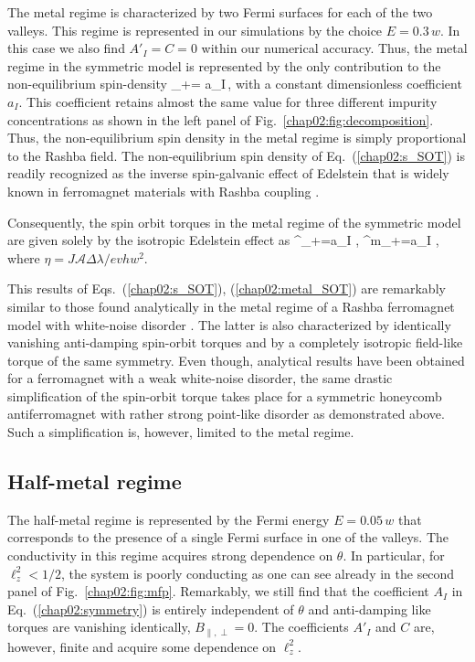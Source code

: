 The metal regime is characterized by two Fermi surfaces for each of the two valleys. This regime is represented in our simulations by the choice $E=0.3\,w$. In this case we also find $A'_I=C=0$ within our numerical accuracy. Thus, the metal regime in the symmetric model is represented by the only contribution to the non-equilibrium spin-density
\be
\label{chap02:s_SOT}
\delta{}_+=  a_I\,\times {}, 
\e
with a constant dimensionless coefficient $a_I$. This coefficient retains almost the same value for three different impurity concentrations as 
shown in the left panel of Fig.~\ref{chap02:fig:decomposition}. Thus, the non-equilibrium spin density in the metal regime is simply proportional to the Rashba field. The non-equilibrium spin density of Eq.~(\ref{chap02:s_SOT}) is readily recognized as the inverse spin-galvanic effect of Edelstein \cite{edelstein_spin_1990} that is widely known in ferromagnet materials with Rashba coupling \cite{manchon_theory_2008, garate_influence_2009}. 

Consequently, the spin orbit torques in the metal regime of the symmetric model are given solely by the isotropic Edelstein effect as
\be
\label{chap02:metal_SOT}
^\ell_+=a_I \eta\;\bb{\ell} \times{},\quad
{}^m_+=a_I \eta\; \!\times\!, 
\e
where $\eta=J\mathcal{A}\Delta\lambda /evh w^2$. 

This results of Eqs.~(\ref{chap02:s_SOT}), (\ref{chap02:metal_SOT}) are remarkably similar to those found analytically in the metal regime of a Rashba ferromagnet model with white-noise disorder \cite{ado_microscopic_2017,ado_anisotropy_2019}. The latter is also characterized by identically vanishing anti-damping spin-orbit torques and by a completely isotropic field-like torque of the same symmetry. Even though, analytical results have been obtained for a ferromagnet with a weak white-noise disorder, the same drastic simplification of the spin-orbit torque takes place for a symmetric honeycomb antiferromagnet with rather strong point-like disorder as demonstrated above. Such a simplification is, however, limited to the metal regime. 
 
\subsection{Half-metal regime} 
 
The half-metal regime is represented by the Fermi energy $E=0.05\,w$ that corresponds to the presence of a single Fermi surface in one of the valleys. The conductivity in this regime acquires strong dependence on $\theta$. In particular, for $\ell_z^2<1/2$, the system is poorly conducting as one can see already in the second panel of Fig.~\ref{chap02:fig:mfp}. Remarkably, we still find that the coefficient $A_I$ in Eq.~(\ref{chap02:symmetry}) is entirely independent of $\theta$ and anti-damping like torques are vanishing identically, $B_{\parallel,\perp}=0$. The coefficients $A'_I$ and $C$ are, however, finite and acquire some dependence on $\ell_z^2$.   

